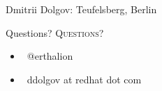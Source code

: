 \documentclass[usenames,dvipsnames, 18pt, compress, aspectratio=169]{beamer}
\def\twitter{{\faTwitter}}
\def\email{{\faEnvelope}}
\begin{document}
\begin{frame}
    \frametitle{}
    \begin{center}
            {Dmitrii Dolgov: Teufelsberg, Berlin}

    \end{center}
\end{frame}

\fontsize{18pt}{18}\selectfont
\begin{frame}
  \vspace*{2.5cm}
  \begin{minipage}[b][\paperheight]{\textwidth}
  \begin{center}

      \linespread{1.0}%
      \if@noSmallCapitals%
        Questions?
      \else%
        \scshape{\color{black} Questions?}%
      \fi%
      \vspace*{0.3em}

      \fontsize{13pt}{14}\selectfont
        \begin{itemize}[label={}]
            \item {\color{black} \twitter\ @erthalion}
            \item {\color{black} \email\ ddolgov at redhat dot com}
        \end{itemize}
      \vspace*{2.5em}%

    \vfill
    \vspace*{2em}
  \end{center}
  \end{minipage}

\end{frame}
\end{document}

